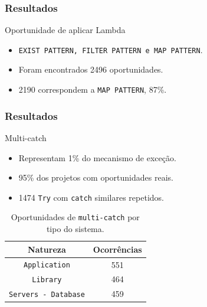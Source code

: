 \documentclass[]{beamer}
\begin{document}
	
	\begin{frame}[fragile, label=re]\frametitle{Resultados}
		\begin{block}{Oportunidade de aplicar Lambda}
			\begin{itemize}
				\item \texttt{EXIST PATTERN, FILTER PATTERN e MAP PATTERN}.
				\item Foram encontrados 2496 oportunidades.
				\item 2190 correspondem a \texttt{MAP PATTERN}, 87\%.
			\end{itemize}
		\end{block}
	\end{frame}
	
	\begin{frame}[fragile, label=re]\frametitle{Resultados}
		\begin{block}{Multi-catch}
			\begin{itemize}
				\item Representam 1\% do mecanismo de exceção.
				
				\item 95\% dos projetos com oportunidades reais.
				
				\item 1474 \texttt{Try} com \texttt{catch} similares repetidos.
				
			\end{itemize}
			
		\end{block}
		
		\begin{table}[h]
			\centering
			\caption{Oportunidades de \texttt{multi-catch} por tipo do sistema.}
			\begin{tabular}{cc}
				\hline
				Natureza & Ocorrências \\ 
				\hline \hline
				\texttt{Application} & 551 \\ 
				\texttt{Library} &  464 \\ 
				\texttt{Servers - Database} &  459 \\ \hline
			\end{tabular}
			\label{tab:oportunidadesMulticatch} %
		\end{table}
		
	\end{frame}	
	
\end{document}
